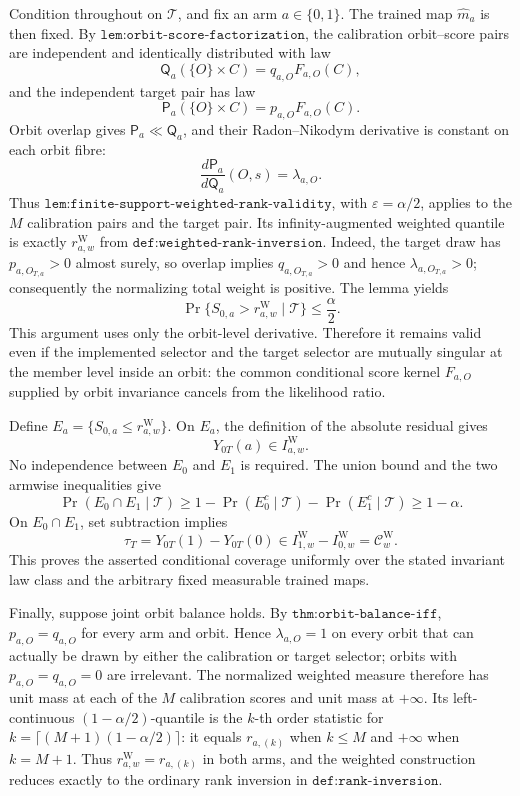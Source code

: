 Condition throughout on \(\mathcal T\), and fix an arm \(a\in\{0,1\}\). The trained map \(\widehat m_a\) is then fixed. By \(\texttt{lem:orbit-score-factorization}\), the calibration orbit--score pairs are independent and identically distributed with law
\[\mathsf Q_a(\{O\}\times C)=q_{a,O}F_{a,O}(C),\]
and the independent target pair has law
\[\mathsf P_a(\{O\}\times C)=p_{a,O}F_{a,O}(C).\]
Orbit overlap gives \(\mathsf P_a\ll\mathsf Q_a\), and their Radon--Nikodym derivative is constant on each orbit fibre:
\[\frac{d\mathsf P_a}{d\mathsf Q_a}(O,s)=\lambda_{a,O}.\]
Thus \(\texttt{lem:finite-support-weighted-rank-validity}\), with \(\varepsilon=\alpha/2\), applies to the \(M\) calibration pairs and the target pair. Its infinity-augmented weighted quantile is exactly \(r^{\mathrm W}_{a,w}\) from \(\texttt{def:weighted-rank-inversion}\). Indeed, the target draw has \(p_{a,O_{T,a}}>0\) almost surely, so overlap implies \(q_{a,O_{T,a}}>0\) and hence \(\lambda_{a,O_{T,a}}>0\); consequently the normalizing total weight is positive. The lemma yields
\[\Pr\{S_{0,a}>r^{\mathrm W}_{a,w}\mid\mathcal T\}\le \frac{\alpha}{2}.\]
This argument uses only the orbit-level derivative. Therefore it remains valid even if the implemented selector and the target selector are mutually singular at the member level inside an orbit: the common conditional score kernel \(F_{a,O}\) supplied by orbit invariance cancels from the likelihood ratio.

Define \(E_a=\{S_{0,a}\le r^{\mathrm W}_{a,w}\}\). On \(E_a\), the definition of the absolute residual gives
\[Y_{0T}(a)\in I^{\mathrm W}_{a,w}.\]
No independence between \(E_0\) and \(E_1\) is required. The union bound and the two armwise inequalities give
\[\Pr(E_0\cap E_1\mid\mathcal T)\ge 1-\Pr(E_0^c\mid\mathcal T)-\Pr(E_1^c\mid\mathcal T)\ge1-\alpha.\]
On \(E_0\cap E_1\), set subtraction implies
\[\tau_T=Y_{0T}(1)-Y_{0T}(0)\in I^{\mathrm W}_{1,w}-I^{\mathrm W}_{0,w}=\mathcal C^{\mathrm W}_w.\]
This proves the asserted conditional coverage uniformly over the stated invariant law class and the arbitrary fixed measurable trained maps.

Finally, suppose joint orbit balance holds. By \(\texttt{thm:orbit-balance-iff}\), \(p_{a,O}=q_{a,O}\) for every arm and orbit. Hence \(\lambda_{a,O}=1\) on every orbit that can actually be drawn by either the calibration or target selector; orbits with \(p_{a,O}=q_{a,O}=0\) are irrelevant. The normalized weighted measure therefore has unit mass at each of the \(M\) calibration scores and unit mass at \(+\infty\). Its left-continuous \((1-\alpha/2)\)-quantile is the \(k\)-th order statistic for \(k=\lceil(M+1)(1-\alpha/2)\rceil\): it equals \(r_{a,(k)}\) when \(k\le M\) and \(+\infty\) when \(k=M+1\). Thus \(r^{\mathrm W}_{a,w}=r_{a,(k)}\) in both arms, and the weighted construction reduces exactly to the ordinary rank inversion in \(\texttt{def:rank-inversion}\).